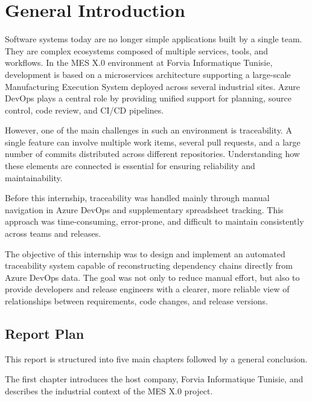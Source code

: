 \chapter*{General Introduction}

\raggedbottom
\sloppy

Software systems today are no longer simple applications built by a single team.
They are complex ecosystems composed of multiple services, tools, and workflows.
In the MES X.0 environment at Forvia Informatique Tunisie, development is based on a
microservices architecture supporting a large-scale Manufacturing Execution System
deployed across several industrial sites. Azure DevOps plays a central role by
providing unified support for planning, source control, code review, and CI/CD pipelines.

However, one of the main challenges in such an environment is traceability.
A single feature can involve multiple work items, several pull requests, and a
large number of commits distributed across different repositories. Understanding
how these elements are connected is essential for ensuring reliability and
maintainability.

Before this internship, traceability was handled mainly through manual navigation
in Azure DevOps and supplementary spreadsheet tracking. This approach was time-consuming,
error-prone, and difficult to maintain consistently across teams and releases.

The objective of this internship was to design and implement an automated
traceability system capable of reconstructing dependency chains directly from
Azure DevOps data. The goal was not only to reduce manual effort, but also to
provide developers and release engineers with a clearer, more reliable view of
relationships between requirements, code changes, and release versions.


\newpage

\section*{Report Plan}
\vspace{0.5em}

This report is structured into five main chapters followed by a general conclusion.

The first chapter introduces the host company, Forvia Informatique Tunisie,
and describes the industrial context of the MES X.0 project.


